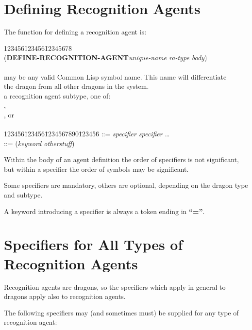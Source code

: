 \section{Defining Recognition Agents}

The function for defining a recognition agent is:

\begin{tabbing}
123456\=123456\=12345678\= \kill
\\
\>({\bf DEFINE-RECOGNITION-AGENT}{\it  unique-name ra-type body\/}) \\
\\
\> may be any valid Common Lisp symbol name.
This name will differentiate \\
\>\>\>the dragon from all other dragons in the system. \\
\> a recognition agent subtype, one of:\\
\>\>, \\
\>\>, or \\
\>\> \\
123456\=123456\=1234567890\=123456\= \kill
\> \>::= {\it specifier specifier\/} \ldots \\
\> \>::= ({\it keyword otherstuff\/})
\\
\end{tabbing}
Within the body of an agent definition the order of specifiers is not
significant, but within a specifier the order of symbols may be significant.

Some specifiers are mandatory, others are optional, depending on the
dragon type and subtype.

A keyword introducing a specifier is always a token ending in {\bf ``=''}.





\section{Specifiers for All Types of Recognition Agents}

Recognition agents are dragons, so the specifiers which apply in
general to dragons apply also to recognition agents.

The following specifiers may (and sometimes must) be supplied for any
type of recognition agent:

